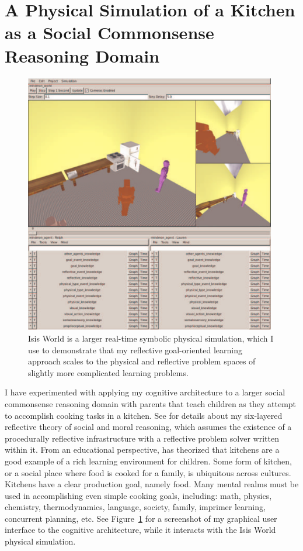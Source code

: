 \section{A Physical Simulation of a Kitchen as a Social Commonsense Reasoning Domain}

\begin{figure}[bth]
  \center
  \includegraphics[width=11cm]{gfx/mindmon-isis_world-screenshot-1}
  \caption[Isis World is a larger physical simulation than the Blocks
    World toy problem.]{Isis World is a larger real-time symbolic
    physical simulation, which I use to demonstrate that my reflective
    goal-oriented learning approach scales to the physical and
    reflective problem spaces of slightly more complicated learning
    problems.}
  \label{fig:mindmon-isis_world-screenshot-1}
\end{figure}

I have experimented with applying my cognitive architecture to a
larger social commonsense reasoning domain with parents that teach
children as they attempt to accomplish cooking tasks in a kitchen.
See \cite{morgan:2011} for details about my six-layered reflective
theory of social and moral reasoning, which assumes the existence of a
procedurally reflective infrastructure with a reflective problem
solver written within it.  From an educational perspective,
\cite{dewey:1907} has theorized that kitchens are a good example of a
rich learning environment for children.  Some form of kitchen, or a
social place where food is cooked for a family, is ubiquitous across
cultures.  Kitchens have a clear production goal, namely food.  Many
mental realms must be used in accomplishing even simple cooking goals,
including: math, physics, chemistry, thermodynamics, language,
society, family, imprimer learning, concurrent planning, etc.  See
Figure~\ref{fig:mindmon-isis_world-screenshot-1} for a screenshot of
my graphical user interface to the cognitive architecture, while it
interacts with the Isis World physical simulation.


